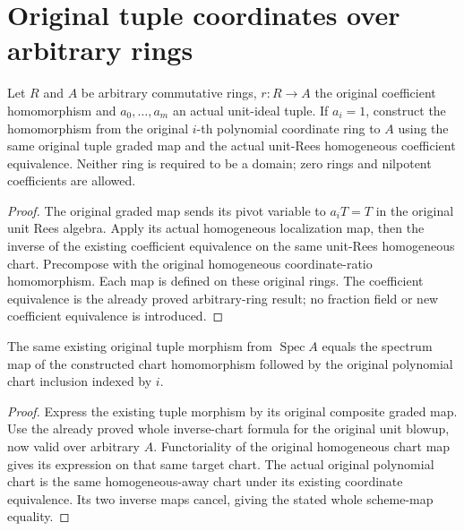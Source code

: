 \section{Original tuple coordinates over arbitrary rings}

\begin{definition}
\label{def:general-generated-tuple-original-chart-ring-map}
\leanok
Let $R$ and $A$ be arbitrary commutative rings, $r:R\to A$ the original
coefficient homomorphism and $a_0,\ldots,a_m$ an actual unit-ideal tuple.
If $a_i=1$, construct the homomorphism from the original $i$-th polynomial
coordinate ring to $A$ using the same original tuple graded map and the
actual unit-Rees homogeneous coefficient equivalence. Neither ring is
required to be a domain; zero rings and nilpotent coefficients are allowed.
\end{definition}
\begin{proof}
The original graded map sends its pivot variable to $a_iT=T$ in the
original unit Rees algebra. Apply its actual homogeneous localization map,
then the inverse of the existing coefficient equivalence on the same
unit-Rees homogeneous chart. Precompose with the original homogeneous
coordinate-ratio homomorphism. Each map is defined on these original rings.
The coefficient equivalence is the already proved arbitrary-ring result;
no fraction field or new coefficient equivalence is introduced.
\end{proof}

\begin{theorem}
\label{thm:general-generated-tuple-original-chart-factor}
\leanok
The same existing original tuple morphism from $\operatorname{Spec}A$
equals the spectrum map of the constructed chart homomorphism followed
by the original polynomial chart inclusion indexed by $i$.
\end{theorem}
\begin{proof}
Express the existing tuple morphism by its original composite graded map.
Use the already proved whole inverse-chart formula for the original unit
blowup, now valid over arbitrary $A$. Functoriality of the original
homogeneous chart map gives its expression on that same target chart.
The actual original polynomial chart is the same homogeneous-away chart
under its existing coordinate equivalence. Its two inverse maps cancel,
giving the stated whole scheme-map equality.
\end{proof}

